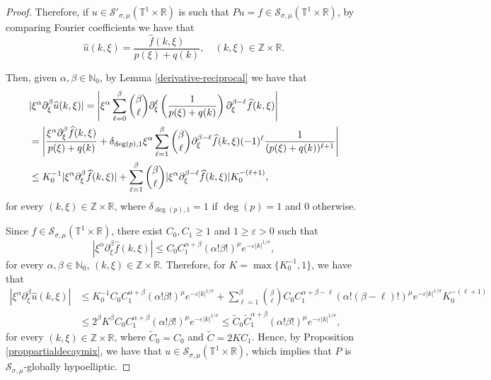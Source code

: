 \documentclass[11pt,reqno]{amsart}
\numberwithin{equation}{section}
\theoremstyle{definition}
\theoremstyle{definition}
\newcommand{\T}{\mathbb{T}}
\newcommand{\G}{\mathnormal{\mathbb{T}^{m}\times\mathbb{R}^n}}
\newcommand{\R}{\mathbb{R}}
\newcommand{\Z}{\mathbb{Z}}
\newcommand{\N}{\mathbb{N}}
\newcommand{\s}{\mathcal{S}(\G)}
\renewcommand{\s}{\mathcal{S}_{\sigma,\mu}(\T^1\times\R)}
\renewcommand{\ss}{\mathcal{S}'_{\sigma,\mu}(\T^1\times\R)}
\begin{document}
\begin{proof}
    Therefore,  if $u\in\ss$ is such that $Pu=f\in\s$, by comparing Fourier coefficients we have that
    \[\widehat{u}(k,\xi)=\dfrac{\widehat{f}(k,\xi)}{p(\xi)+q(k)},\quad (k,\xi)\in\Z\times\R.\]
     
    
    Then, given $\alpha,\beta\in\N_0$,  by Lemma \ref{derivative-reciprocal} we have that 
\begin{align}
        & |\xi^\alpha\partial_\xi^\beta\widehat{u}(k,\xi)| =\left|\xi^\alpha\sum_{\ell=0}^\beta \binom{\beta}{\ell}\partial_\xi^{\ell}\left(\frac{1}{p(\xi)+q(k)}\right)\partial_\xi^{\beta-\ell}\widehat{f}(k,\xi)\right|\notag \\
        &=\left| \frac{\xi^\alpha\partial_\xi^\beta\widehat{f}(k,\xi)}{p(\xi)+q(k)}+\delta_{\deg(p),1}\xi^\alpha\sum_{\ell=1}^\beta \binom{\beta}{\ell}\partial_\xi^{\beta-\ell}\widehat{f}(k,\xi) (-1)^{\ell}\frac{1}{(p(\xi)+q(k))^{\ell+1}}\right|\notag\\
        &\leq K_0^{-1}|\xi^\alpha\partial_\xi^\beta\widehat{f}(k,\xi)|+\sum_{\ell=1}^\beta \binom{\beta}{\ell}|\xi^\alpha\partial_\xi^{\beta-\ell}\widehat{f}(k,\xi)|K_0^{-(\ell+1)} \notag,
        \end{align}
    for every $(k,\xi)\in\Z\times \R$, where $\delta_{\deg(p),1}=1$ if $\deg(p)=1$ and $0$ otherwise. 
    
    Since $f\in\s$, there exist $C_0,C_1\geq 1$ and $1\geq \varepsilon>0$ such that
    \begin{equation}\label{eq_estimates_f}     |\xi^\alpha\partial_\xi^\beta\widehat{f}(k,\xi)|\leq C_0C_1^{\alpha+\beta}(\alpha!\beta!)^\mu e^{-\varepsilon|k|^{1/\sigma}},
    \end{equation}  
    for every $\alpha,\beta\in\N_0$, $(k,\xi)\in\Z\times\R$. Therefore, for $K=\max\{K_0^{-1},1\}$, we have that 
\begin{align*}
      |\xi^\alpha\partial_\xi^\beta\widehat{u}(k,\xi)| &\leq K_0^{-1}C_0C_1^{\alpha+\beta}(\alpha!\beta!)^\mu e^{-\varepsilon|k|^{1/\sigma}}+\sum_{\ell=1}^\beta \binom{\beta}{\ell}C_0C_1^{\alpha+\beta-\ell}(\alpha!(\beta-\ell)!)^\mu e^{-\varepsilon|k|^{1/\sigma}}K_0^{-(\ell+1)}\\
      &\leq 2^\beta K^{\beta}C_0C_1^{\alpha+\beta}(\alpha!\beta!)^\mu e^{-\varepsilon|k|^{1/\sigma}}\leq \tilde C_0 \tilde C_1^{\alpha+\beta}(\alpha!\beta!)^\mu e^{-\varepsilon|k|^{1/\sigma}},
\end{align*}
for every $(k,\xi)\in\Z\times \R$, where $\tilde C_0=C_0$ and $\tilde C = 2KC_1$. 
 Hence, by Proposition \ref{proppartialdecaymix}, we have that $u\in\s$, which implies that $P$ is $\mathcal{S}_{\sigma,\mu}$-globally hypoelliptic.
\end{proof}
\end{document}
